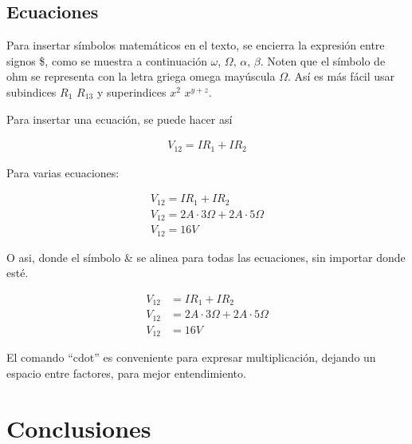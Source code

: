 \documentclass[12pt]{article}
\begin{document}
\subsection{Ecuaciones}
Para insertar símbolos matemáticos en el texto, se encierra la expresión entre signos \$, como se muestra a continuación $\omega$, $\Omega$, $\alpha$, $\beta$. Noten que el símbolo de ohm se representa con la letra griega omega mayúscula $\Omega$. Así es más fácil usar subindices $R_1$ $R_{13}$ y superindices $x^2$ $x^{y+z}$.

Para insertar una ecuación, se puede hacer así

\begin{align}
    V_{12} = I R_1 + I R_2
\end{align}

Para varias ecuaciones:

\begin{align}
    V_{12} = I R_1 + I R_2\\
    V_{12} = 2A \cdot 3\Omega + 2A \cdot 5\Omega\\
    V_{12} = 16V
\end{align}

O asi, donde el símbolo \& se alinea para todas las ecuaciones, sin importar donde esté.

\begin{align}
    V_{12} & = I R_1 + I R_2\\
    V_{12} & = 2A \cdot 3\Omega + 2A \cdot 5\Omega\\
    V_{12} & = 16V
\end{align}

El comando ``cdot'' es conveniente para expresar multiplicación, dejando un espacio entre factores, para mejor entendimiento.

\section{Conclusiones}


\pagebreak

\nocite{*} %
\end{document}
